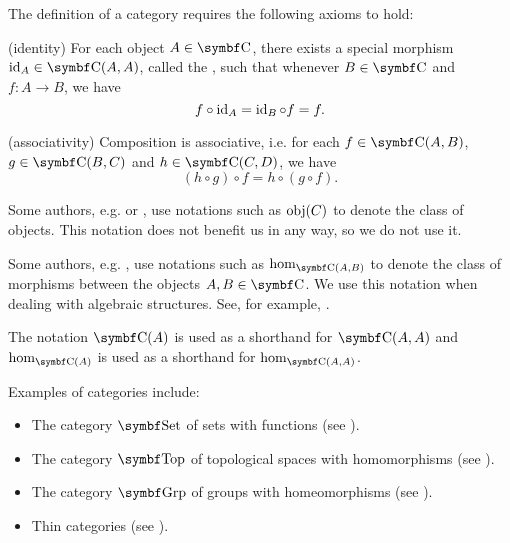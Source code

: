 \begin{definition}
  The definition of a category requires the following axioms to hold:
  \begin{DefEnum}[resume=def:category]
    (identity) For each object \( A \in \Cat{C} \), there exists a special morphism \( \Id_A \in \Cat{C}(A, A) \), called the , such that whenever \( B \in \Cat{C} \) and \( f: A \to B \), we have
    \begin{equation*}
      f \circ \operatorname{id}_A = \operatorname{id}_B \circ f = f.
    \end{equation*}

    (associativity) Composition is associative, i.e. for each \( f \in \Cat{C}(A, B) \), \( g \in \Cat{C}(B, C) \) and \( h \in \Cat{C}(C, D) \), we have
    \begin{equation*}
      (h \circ g) \circ f = h \circ (g \circ f).
    \end{equation*}
  \end{DefEnum}
\end{definition}

\begin{remark}\label{remark:category_obj_hom}
  Some authors, e.g. \cite{Leinster2014} or \cite{Aluffi2009}, use notations such as \( \operatorname{obj}(C) \) to denote the class of objects. This notation does not benefit us in any way, so we do not use it.

  Some authors, e.g. \cite{MacLane1994}, use notations such as \( \Op{hom}_{\Cat{C}(A, B)} \) to denote the class of morphisms between the objects \( A, B \in \Cat{C} \). We use this notation when dealing with algebraic structures. See, for example, .

  The notation \( \Cat{C}(A) \) is used as a shorthand for \( \Cat{C}(A, A) \) and \( \hom_{\Cat{C}(A)} \) is used as a shorthand for \( \hom_{\Cat{C}(A, A)} \).
\end{remark}

\begin{example}\label{ex:categories}
  Examples of categories include:

  \begin{itemize}
    \item The category \( \Cat{Set} \) of sets with functions (see ).
    \item The category \( \Cat{Top} \) of topological spaces with homomorphisms (see ).
    \item The category \( \Cat{Grp} \) of groups with homeomorphisms (see ).
    \item Thin categories (see ).
  \end{itemize}
\end{example}

